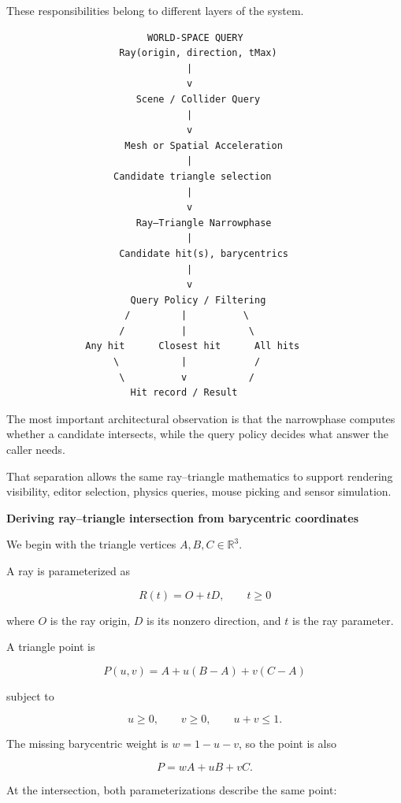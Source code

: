 These responsibilities belong to different layers of the system.

\begin{verbatim}
                         WORLD-SPACE QUERY
                    Ray(origin, direction, tMax)
                                |
                                v
                       Scene / Collider Query
                                |
                                v
                     Mesh or Spatial Acceleration
                                |
                   Candidate triangle selection
                                |
                                v
                       Ray–Triangle Narrowphase
                                |
                    Candidate hit(s), barycentrics
                                |
                                v
                      Query Policy / Filtering
                     /         |          \
                    /          |           \
              Any hit      Closest hit      All hits
                   \           |            /
                    \          v           /
                      Hit record / Result
\end{verbatim}

The most important architectural observation is that the narrowphase computes whether a candidate intersects, while the query policy decides what answer the caller needs.

That separation allows the same ray--triangle mathematics to support rendering visibility, editor selection, physics queries, mouse picking and sensor simulation.

\textbf{Deriving ray--triangle intersection from barycentric coordinates}

We begin with the triangle vertices \(A,B,C\in\mathbb R^3\).

A ray is parameterized as

\[
R(t)=O+tD,\qquad t\geq0
\]

where \(O\) is the ray origin, \(D\) is its nonzero direction, and \(t\) is the ray parameter.

A triangle point is

\[
P(u,v)=A+u(B-A)+v(C-A)
\]

subject to

\[
u\geq0,\qquad v\geq0,\qquad u+v\leq1.
\]

The missing barycentric weight is \(w=1-u-v\), so the point is also

\[
P=wA+uB+vC.
\]

At the intersection, both parameterizations describe the same point:

